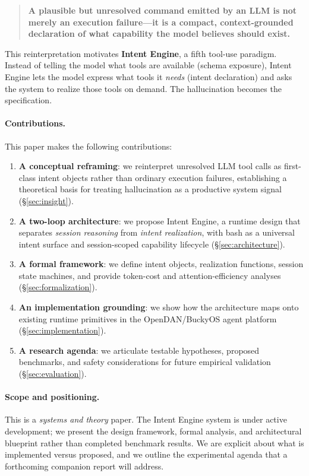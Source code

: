 \documentclass[11pt]{article}
\begin{document}
\begin{quote}
\textbf{A plausible but unresolved command emitted by an LLM is not merely an execution failure---it is a compact, context-grounded declaration of what capability the model believes should exist.}
\end{quote}

This reinterpretation motivates \textbf{Intent Engine}, a fifth tool-use paradigm.
Instead of telling the model what tools are available (schema exposure), Intent Engine lets the model express what tools it \emph{needs} (intent declaration) and asks the system to realize those tools on demand.
The hallucination becomes the specification.

\paragraph{Contributions.}
This paper makes the following contributions:
\begin{enumerate}[leftmargin=*]
  \item \textbf{A conceptual reframing}: we reinterpret unresolved LLM tool calls as first-class intent objects rather than ordinary execution failures, establishing a theoretical basis for treating hallucination as a productive system signal (\S\ref{sec:insight}).
  \item \textbf{A two-loop architecture}: we propose Intent Engine, a runtime design that separates \emph{session reasoning} from \emph{intent realization}, with bash as a universal intent surface and session-scoped capability lifecycle (\S\ref{sec:architecture}).
  \item \textbf{A formal framework}: we define intent objects, realization functions, session state machines, and provide token-cost and attention-efficiency analyses (\S\ref{sec:formalization}).
  \item \textbf{An implementation grounding}: we show how the architecture maps onto existing runtime primitives in the OpenDAN/BuckyOS agent platform (\S\ref{sec:implementation}).
  \item \textbf{A research agenda}: we articulate testable hypotheses, proposed benchmarks, and safety considerations for future empirical validation (\S\ref{sec:evaluation}).
\end{enumerate}

\paragraph{Scope and positioning.}
This is a \emph{systems and theory} paper.
The Intent Engine system is under active development; we present the design framework, formal analysis, and architectural blueprint rather than completed benchmark results.
We are explicit about what is implemented versus proposed, and we outline the experimental agenda that a forthcoming companion report will address.
\end{document}
